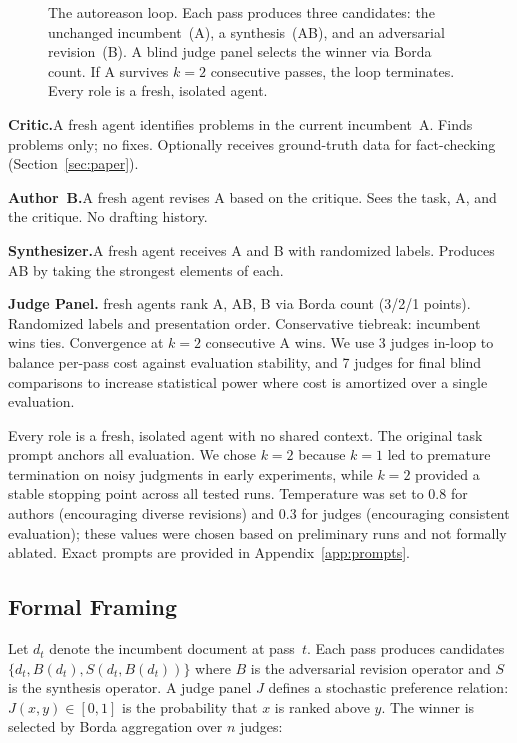 \documentclass[10pt,twocolumn]{article}
\begin{document}
\begin{figure}[t]
\begin{tikzpicture}
\end{tikzpicture}
\caption{The autoreason loop. Each pass produces three candidates: the unchanged incumbent~(A), a synthesis~(AB), and an adversarial revision~(B). A blind judge panel selects the winner via Borda count. If A survives $k{=}2$ consecutive passes, the loop terminates. Every role is a fresh, isolated agent.}
\label{fig:method}
\end{figure}

\textbf{Critic.}\enspace A fresh agent identifies problems in the current incumbent~A. Finds problems only; no fixes. Optionally receives ground-truth data for fact-checking (Section~\ref{sec:paper}).

\textbf{Author~B.}\enspace A fresh agent revises A based on the critique. Sees the task, A, and the critique. No drafting history.

\textbf{Synthesizer.}\enspace A fresh agent receives A and B with randomized labels. Produces AB by taking the strongest elements of each.

\textbf{Judge Panel.} fresh agents rank A, AB, B via Borda count (3/2/1 points). Randomized labels and presentation order. Conservative tiebreak: incumbent wins ties. Convergence at $k{=}2$ consecutive A wins. We use 3 judges in-loop to balance per-pass cost against evaluation stability, and 7 judges for final blind comparisons to increase statistical power where cost is amortized over a single evaluation.

Every role is a fresh, isolated agent with no shared context. The original task prompt anchors all evaluation. We chose $k{=}2$ because $k{=}1$ led to premature termination on noisy judgments in early experiments, while $k{=}2$ provided a stable stopping point across all tested runs. Temperature was set to 0.8 for authors (encouraging diverse revisions) and 0.3 for judges (encouraging consistent evaluation); these values were chosen based on preliminary runs and not formally ablated. Exact prompts are provided in Appendix~\ref{app:prompts}.

\subsection{Formal Framing}

Let $d_t$ denote the incumbent document at pass~$t$. Each pass produces candidates $\{d_t, B(d_t), S(d_t, B(d_t))\}$ where $B$ is the adversarial revision operator and $S$ is the synthesis operator. A judge panel $J$ defines a stochastic preference relation: $J(x, y) \in [0,1]$ is the probability that $x$ is ranked above $y$. The winner is selected by Borda aggregation over $n$ judges:
\end{document}
